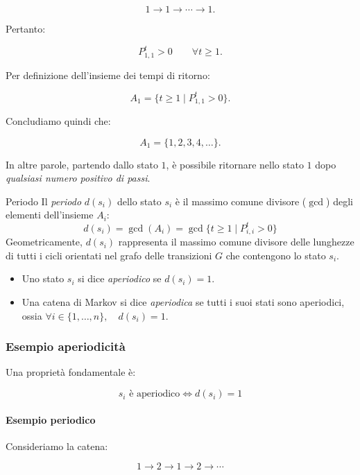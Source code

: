 \begin{example}
$$
1\rightarrow1\rightarrow\cdots\rightarrow1.
$$

Pertanto:

$$
P^t_{1,1}>0
\qquad \forall t\geq1.
$$

Per definizione dell'insieme dei tempi di ritorno:

$$
A_1=\{t\geq1\mid P^t_{1,1}>0\}.
$$

Concludiamo quindi che:

$$
\boxed{A_1=\{1,2,3,4,\ldots\}}.
$$

In altre parole, partendo dallo stato $1$, è possibile ritornare nello stato $1$ dopo \emph{qualsiasi numero positivo di passi}.
\end{example}


\begin{definition}{Periodo}
Il \emph{periodo} $d(s_i)$ dello stato $s_i$ è il massimo comune divisore ($\gcd$) degli elementi dell'insieme $A_i$:
\begin{equation*}
d(s_i) = \gcd(A_i) = \gcd \{ t \ge 1 \mid P_{i,i}^t > 0 \}
\end{equation*}
Geometricamente, $d(s_i)$ rappresenta il massimo comune divisore delle lunghezze di tutti i cicli orientati nel grafo delle transizioni $G$ che contengono lo stato $s_i$.
\begin{itemize}
    \item Uno stato $s_i$ si dice \emph{aperiodico} se $d(s_i) = 1$.
    \item Una catena di Markov si dice \emph{aperiodica} se tutti i suoi stati sono aperiodici, ossia $\forall i \in \{1, \dots, n\}, \quad d(s_i) = 1$.
\end{itemize}
\end{definition}

\subsubsection{Esempio aperiodicità}

Una proprietà fondamentale è:

$$
\boxed{s_i\text{ è aperiodico}\iff d(s_i)=1}
$$

\paragraph{Esempio periodico}

Consideriamo la catena:

$$
1\rightarrow2\rightarrow1\rightarrow2\rightarrow\cdots
$$

